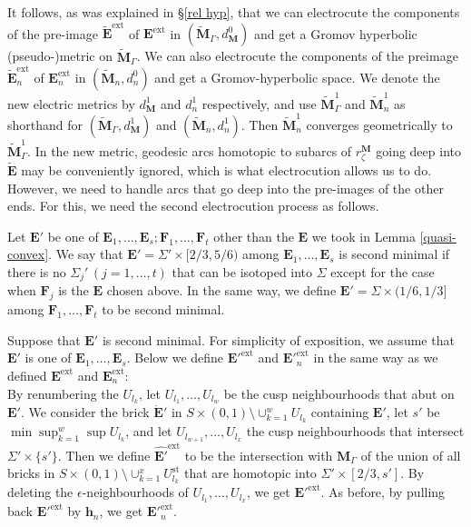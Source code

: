 \documentclass{amsart}
\theoremstyle{definition}
\begin{document}
It follows, as was explained in \S \ref{rel hyp},  that we can electrocute the components of  the pre-image $\widetilde{\mathbf E}^\mathrm{ext}$ of $\mathbf E^\mathrm{ext}$ in $(\widetilde{\mathbf M}_\Gamma, d_{\mathbf M}^0)$  and get a Gromov hyperbolic (pseudo-)metric on $\widetilde{\mathbf M}_\Gamma$. 
We can also electrocute the components of the preimage $\widetilde{\mathbf{E}}_n^\mathrm{ext}$ of $\mathbf E_n^\mathrm{ext}$ in $(\widetilde{\mathbf M}_n, d_n^0)$ and get a Gromov-hyperbolic space.
We denote the new electric metrics by $d^1_{\mathbf M}$ and $d^1_n$ respectively, and use 
 $\widetilde{\mathbf M}_\Gamma^1$ and $\widetilde{\mathbf M}_n^1$ as  shorthand for 
 $(\widetilde{\mathbf M}_\Gamma, d^1_{\mathbf M})$ and $(\widetilde{\mathbf M}_n, d^1_n)$. 
 Then $\widetilde{\mathbf M}_n^1$ converges geometrically to $\widetilde{\mathbf M}_\Gamma^1$.
 In the new metric,  geodesic arcs homotopic to subarcs of $r_\zeta^{\mathbf M}$ going deep   into $\widetilde{\mathbf E}$ may be conveniently ignored, which is what electrocution allows us to do.
However, we need to handle arcs that go deep into the pre-images of the other ends. For this, we need the second electrocution process as follows.


Let $\mathbf E'$ be one of $\mathbf E_1, \dots , \mathbf E_s; \mathbf F_1, \dots , \mathbf F_t$ other than the $\mathbf E$  we took in Lemma \ref{quasi-convex}.
We say that $\mathbf E'=\Sigma' \times [2/3, 5/6)$ among $\mathbf E_1, \dots , \mathbf E_s$ is second minimal if there is no $\Sigma_j'\, (j=1, \dots, t)$ that can be isotoped into $\Sigma$ except for the case when $\mathbf F_j$ is the $\mathbf E$  chosen above.
In the same way, we define $\mathbf E'= \Sigma \times (1/6, 1/3]$ among $\mathbf F_1, \dots, \mathbf F_t$ to be second minimal.

Suppose that $\mathbf E'$ is second minimal.
For simplicity of exposition, we assume that $\mathbf E'$ is one of $\mathbf E_1, \dots , \mathbf E_s$.
Below we define ${\mathbf E'}^\mathrm{ext}$ and ${\mathbf E'}_n^\mathrm{ext}$ in the same way as we defined $\mathbf E^\mathrm{ext}$ and $\mathbf E_n^\mathrm{ext}$:\\
By renumbering the $U_{l_k}$, let $U_{l_1}, \dots , U_{l_w}$ be the cusp neighbourhoods that abut on $\mathbf E'$.
We consider the brick $\dot{\mathbf E}'$ in $S \times (0,1) \setminus \cup_{k=1}^w U_{l_k}$ containing $\mathbf E'$,  let $s'$ be $\min \sup_{k=1}^w \sup U_{l_k}$, and let $U_{l_{w+1}}, \dots , U_{l_x}$ the cusp neighbourhoods that intersect $\Sigma' \times \{s'\}$.
Then we define $\hat{\mathbf E'}^\mathrm{ext}$ to be the intersection with $\mathbf M_\Gamma$ of the union of all bricks in $S \times (0,1) \setminus \cup_{k=1}^x U_{l_k}^\mathrm{st}$ that are homotopic into $\Sigma' \times [2/3, s']$. 
By deleting the $\epsilon$-neighbourhoods of $U_{l_1}, \dots , U_{l_x}$, we get ${\mathbf E'}^\mathrm{ext}$.
As before, by pulling back ${\mathbf E'}^\mathrm{ext}$ by $\mathbf h_n$, we get ${\mathbf E'}^\mathrm{ext}_n$. 
\end{document}

